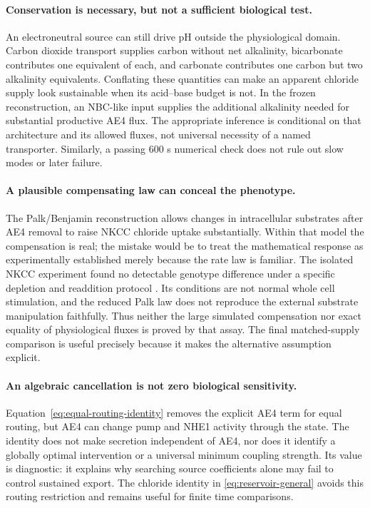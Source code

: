 \documentclass[11pt]{article}
\begin{document}
\paragraph{Conservation is necessary, but not a sufficient biological test.}
An electroneutral source can still drive pH outside the physiological domain. Carbon dioxide transport supplies carbon without net alkalinity, bicarbonate contributes one equivalent of each, and carbonate contributes one carbon but two alkalinity equivalents. Conflating these quantities can make an apparent chloride supply look sustainable when its acid--base budget is not. In the frozen reconstruction, an NBC-like input supplies the additional alkalinity needed for substantial productive AE4 flux. The appropriate inference is conditional on that architecture and its allowed fluxes, not universal necessity of a named transporter. Similarly, a passing 600 s numerical check does not rule out slow modes or later failure.

\paragraph{A plausible compensating law can conceal the phenotype.}
The Palk/Benjamin reconstruction allows changes in intracellular substrates after AE4 removal to raise NKCC chloride uptake substantially. Within that model the compensation is real; the mistake would be to treat the mathematical response as experimentally established merely because the rate law is familiar. The isolated NKCC experiment found no detectable genotype difference under a specific depletion and readdition protocol \citep{Pena2015}. Its conditions are not normal whole cell stimulation, and the reduced Palk law does not reproduce the external substrate manipulation faithfully. Thus neither the large simulated compensation nor exact equality of physiological fluxes is proved by that assay. The final matched-supply comparison is useful precisely because it makes the alternative assumption explicit.

\paragraph{An algebraic cancellation is not zero biological sensitivity.}
Equation~\eqref{eq:equal-routing-identity} removes the explicit AE4 term for equal routing, but AE4 can change pump and NHE1 activity through the state. The identity does not make secretion independent of AE4, nor does it identify a globally optimal intervention or a universal minimum coupling strength. Its value is diagnostic: it explains why searching source coefficients alone may fail to control sustained export. The chloride identity in \cref{eq:reservoir-general} avoids this routing restriction and remains useful for finite time comparisons.
\end{document}
